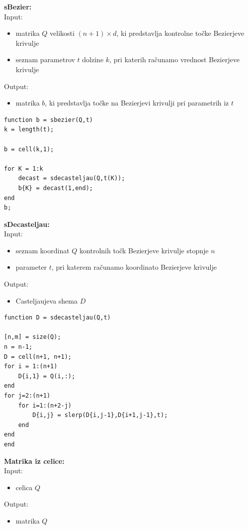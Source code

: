 \documentclass[12pt,a4paper,twoside]{article}
\theoremstyle{definition} %
\theoremstyle{plain} %
\numberwithin{equation}{section}  %
\begin{document}
\textbf{sBezier:}\\
Input:
\begin{itemize}
\item matrika $Q$ velikosti $(n+1) \times d$, ki predstavlja kontrolne točke Bezierjeve krivulje
\item seznam parametrov $t$ dolzine $k$, pri katerih računamo vrednost Bezierjeve krivulje
\end{itemize}
Output:
\begin{itemize}
\item matrika $b$, ki predstavlja točke na Bezierjevi krivulji pri parametrih iz $t$
\end{itemize}

\begin{lstlisting}[caption = {sbezier}]
function b = sbezier(Q,t)
k = length(t);

b = cell(k,1);

for K = 1:k
    decast = sdecasteljau(Q,t(K));
    b{K} = decast(1,end);
end
b;
\end{lstlisting}

\vspace{0.5cm}
\textbf{sDecasteljau:}\\
Input:
\begin{itemize}
\item seznam koordinat $Q$ kontrolnih točk Bezierjeve krivulje stopnje $n$
\item parameter $t$, pri katerem računamo koordinato Bezierjeve krivulje
\end{itemize}
Output:
\begin{itemize}
\item Casteljaujeva shema $D$
\end{itemize}

\begin{lstlisting}[caption = {sdecasteljau}]
function D = sdecasteljau(Q,t)

[n,m] = size(Q);
n = n-1;
D = cell(n+1, n+1);
for i = 1:(n+1)
    D{i,1} = Q(i,:);
end
for j=2:(n+1)
    for i=1:(n+2-j)
        D{i,j} = slerp(D{i,j-1},D{i+1,j-1},t);
    end
end
end
\end{lstlisting}

\textbf{Matrika iz celice:}\\
Input:
\begin{itemize}
\item celica $Q$
\end{itemize}
Output:
\begin{itemize}
\item matrika $Q$
\end{itemize}
\end{document}
